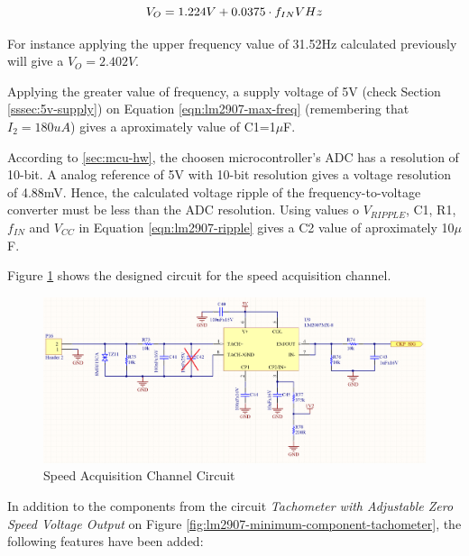 			\begin{equation}\label{eqn:diameter-to-length}
				V_{O}=1.224V + 0.0375 \cdot f_{IN} V\/Hz
			\end{equation}

			For instance applying the upper frequency value of 31.52Hz calculated previously will give a $V_{O}=2.402V$. 



			Applying the greater value of frequency, a supply voltage of 5V (check Section \ref{sssec:5v-supply}) on Equation \ref{eqn:lm2907-max-freq} (remembering that $I_{2}=180uA$) gives a aproximately value of C1=1$\mu$F.
			\par
			According to \ref{sec:mcu-hw}, the choosen microcontroller's ADC has a resolution of 10-bit. A analog reference of 5V with 10-bit resolution gives a voltage resolution of 4.88mV. Hence, the calculated voltage ripple of the frequency-to-voltage converter must be less than the ADC resolution. Using values o $V_{RIPPLE}$, C1, R1, $f_{IN}$ and $V_{CC}$ in Equation \ref{eqn:lm2907-ripple} gives a C2 value of aproximately 10$\mu$F.
			\par
			Figure \ref{fig:ckp-conditioning-circuit} shows the designed circuit for the speed acquisition channel.

			\begin{figure}[htbp]
				\centering
					\includegraphics[scale=0.6]{figuras/fig-ckp-conditioning-circuit.png}
				\caption{Speed Acquisition Channel Circuit}
				\label{fig:ckp-conditioning-circuit}
			\end{figure}

			In addition to the components from the circuit \textit{Tachometer with Adjustable Zero Speed Voltage Output} on Figure \ref{fig:lm2907-minimum-component-tachometer}, the following features have been added:

